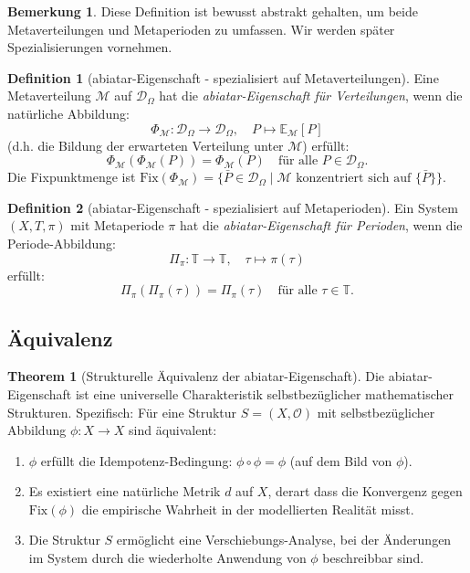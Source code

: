\documentclass[a4paper,12pt]{article}
\theoremstyle{definition}
\newtheorem{definition}{Definition}
\newtheorem{bemerkung}{Bemerkung}
\newtheorem{theorem}{Theorem}
\begin{document}
\begin{bemerkung}
Diese Definition ist bewusst abstrakt gehalten, um beide Metaverteilungen und Metaperioden zu umfassen. Wir werden später Spezialisierungen vornehmen.
\end{bemerkung}

\begin{definition}[abiatar-Eigenschaft - spezialisiert auf Metaverteilungen]
Eine Metaverteilung $\mathcal{M}$ auf $\mathcal{D}_\Omega$ hat die \textit{abiatar-Eigenschaft für Verteilungen}, wenn die natürliche Abbildung:
\[
\Phi_\mathcal{M}: \mathcal{D}_\Omega \to \mathcal{D}_\Omega, \quad P \mapsto \mathbb{E}_{\mathcal{M}}[P]
\]
(d.h. die Bildung der erwarteten Verteilung unter $\mathcal{M}$) erfüllt:
\[
\Phi_\mathcal{M}(\Phi_\mathcal{M}(P)) = \Phi_\mathcal{M}(P) \quad \text{für alle } P \in \mathcal{D}_\Omega.
\]
Die Fixpunktmenge ist $\text{Fix}(\Phi_\mathcal{M}) = \{\bar{P} \in \mathcal{D}_\Omega \mid \mathcal{M} \text{ konzentriert sich auf } \{\bar{P}\}\}$.
\end{definition}

\begin{definition}[abiatar-Eigenschaft - spezialisiert auf Metaperioden]
Ein System $(X, T, \pi)$ mit Metaperiode $\pi$ hat die \textit{abiatar-Eigenschaft für Perioden}, wenn die Periode-Abbildung:
\[
\Pi_\pi: \mathbb{T} \to \mathbb{T}, \quad \tau \mapsto \pi(\tau)
\]
erfüllt:
\[
\Pi_\pi(\Pi_\pi(\tau)) = \Pi_\pi(\tau) \quad \text{für alle } \tau \in \mathbb{T}.
\]
\end{definition}

\subsection{Äquivalenz}

\begin{theorem}[Strukturelle Äquivalenz der abiatar-Eigenschaft]
\label{thm:abiatar_equivalence}
Die abiatar-Eigenschaft ist eine universelle Charakteristik selbstbezüglicher mathematischer Strukturen. Spezifisch: Für eine Struktur $S = (X, \mathcal{O})$ mit selbstbezüglicher Abbildung $\phi: X \to X$ sind äquivalent:
\begin{enumerate}
	\item $\phi$ erfüllt die Idempotenz-Bedingung: $\phi \circ \phi = \phi$ (auf dem Bild von $\phi$).
	\item Es existiert eine natürliche Metrik $d$ auf $X$, derart dass die Konvergenz gegen $\text{Fix}(\phi)$ die empirische Wahrheit in der modellierten Realität misst.
	\item Die Struktur $S$ ermöglicht eine Verschiebungs-Analyse, bei der Änderungen im System durch die wiederholte Anwendung von $\phi$ beschreibbar sind.
\end{enumerate}
\end{theorem}
\end{document}
